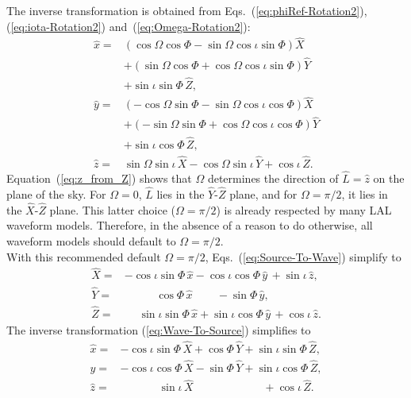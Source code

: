 \documentclass[11pt,tightenlines,article,amssymb,amsmath,amsfonts,superscriptaddress,nofootinbib]{revtex4}
\newcommand{\lNR}{\hat L}
\newcommand{\ExS}{{{\hat x}}}
\newcommand{\EyS}{{{\hat y}}}
\newcommand{\EzS}{{{\hat z}}}
\newcommand{\ExW}{\hat X}
\newcommand{\EyW}{\hat Y}
\newcommand{\EzW}{\hat Z}
\newcommand{\phiRef}{\Phi} %
\begin{document}
The inverse transformation is obtained from
Eqs.~(\ref{eq:phiRef-Rotation2}), (\ref{eq:iota-Rotation2})
and~(\ref{eq:Omega-Rotation2}):
\begin{subequations}
  \label{eq:Wave-To-Source}
  \begin{align}
    \ExS=& \left(\cos\Omega\cos\phiRef-\sin\Omega\cos\iota\sin\phiRef\right)\ExW
    \nonumber \\
    & + \left(\sin\Omega\cos\phiRef+\cos\Omega\cos\iota\sin\phiRef\right)\EyW
    \nonumber\\
    & + \sin\iota\sin\phiRef\,\EzW,\\
\EyS=& \left(-\cos\Omega\sin\phiRef-\sin\Omega\cos\iota\cos\phiRef\right)\ExW
    \nonumber \\
    & + \left(-\sin\Omega\sin\phiRef+\cos\Omega\cos\iota\cos\phiRef\right)\EyW
    \nonumber\\
    & + \sin\iota\cos\phiRef\,\EzW,\\
\label{eq:z_from_Z}
    \EzS=&\sin\Omega\sin\iota\,\ExW-\cos\Omega\sin\iota\,\EyW + \cos\iota\,\EzW.
  \end{align}
  \end{subequations}
Equation~(\ref{eq:z_from_Z}) shows that $\Omega$ determines the
direction of $\lNR=\hat z$ on the plane of the sky.  For $\Omega=0$,
$\lNR$ lies in the $\EyW$-$\EzW$ plane, and for $\Omega=\pi/2$, it lies
in the $\ExW$-$\EzW$ plane. This latter choice ($\Omega=\pi/2$) is already 
respected by many LAL
waveform models.  Therefore, in the absence of a reason to do
otherwise, all waveform models should default to $\Omega=\pi/2$.  \\
With this recommended default $\Omega=\pi/2$,
Eqs.~(\ref{eq:Source-To-Wave}) simplify to
\begin{subequations}
  \label{eq:Source-To-Wave-Omega0}
  \begin{align}
    \ExW=& -\cos\iota\sin\phiRef\,\ExS-\cos\iota\cos\phiRef\,\EyS\,+\sin\iota\,\EzS,\\
    \EyW=&\quad\quad\;\;\; \cos\phiRef\,\ExS\qquad\,-\sin\phiRef\,\EyS,\\
\label{eq:Z_from_z-Omega0}
\EzW=&\;\;\;\;\,\sin\iota\sin\phiRef\,\ExS+\sin\iota\cos\phiRef\,\EyS\, + \cos\iota\,\EzS.
  \end{align}
  \end{subequations}
The inverse transformation (\ref{eq:Wave-To-Source}) simplifies to 
\begin{subequations}
  \label{eq:Wave-To-Source-Omega0}
  \begin{align}
    \ExS=& -\cos\iota\sin\phiRef\,\ExW+\cos\phiRef\,\EyW
    + \sin\iota\sin\phiRef\,\EzW,\\
    \EyS=& -\cos\iota\cos\phiRef\,\ExW-\sin\phiRef\,\EyW
    + \sin\iota\cos\phiRef\,\EzW,\\
    \EzS=&\qquad\quad\;\,\sin\iota\,\ExW \qquad\qquad\qquad\;+\cos\iota\,\EzW.
  \end{align}
  \end{subequations}
\end{document}
